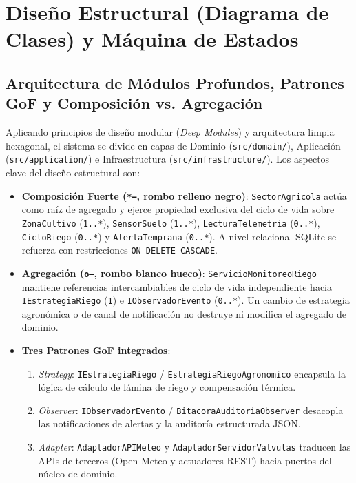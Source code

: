 \documentclass[11pt,letterpaper]{report}
\begin{document}
\chapter{Diseño Estructural (Diagrama de Clases) y Máquina de Estados}

\section{Arquitectura de Módulos Profundos, Patrones GoF y Composición vs. Agregación}
Aplicando principios de diseño modular (\textit{Deep Modules}) y arquitectura limpia hexagonal, el sistema se divide en capas de Dominio (\texttt{src/domain/}), Aplicación (\texttt{src/application/}) e Infraestructura (\texttt{src/\allowbreak infrastructure/}). Los aspectos clave del diseño estructural son:

\begin{itemize}[leftmargin=*]
    \item \textbf{Composición Fuerte (\texttt{*--}, rombo relleno negro)}: \texttt{SectorAgricola} actúa como raíz de agregado y ejerce propiedad exclusiva del ciclo de vida sobre \texttt{ZonaCultivo} (\texttt{1..*}), \texttt{SensorSuelo} (\texttt{1..*}), \texttt{LecturaTelemetria} (\texttt{0..*}), \texttt{CicloRiego} (\texttt{0..*}) y \texttt{AlertaTemprana} (\texttt{0..*}). A nivel relacional SQLite se refuerza con restricciones \texttt{ON DELETE CASCADE}.
    \item \textbf{Agregación (\texttt{o--}, rombo blanco hueco)}: \texttt{ServicioMonitoreoRiego} mantiene referencias intercambiables de ciclo de vida independiente hacia \texttt{IEstrategiaRiego} (\texttt{1}) e \texttt{IObservadorEvento} (\texttt{0..*}). Un cambio de estrategia agronómica o de canal de notificación no destruye ni modifica el agregado de dominio.
    \item \textbf{Tres Patrones GoF integrados}:
    \begin{enumerate}
        \item \textit{Strategy}: \texttt{IEstrategiaRiego} / \texttt{EstrategiaRiegoAgronomico} encapsula la lógica de cálculo de lámina de riego y compensación térmica.
        \item \textit{Observer}: \texttt{IObservadorEvento} / \texttt{BitacoraAuditoriaObserver} desacopla las notificaciones de alertas y la auditoría estructurada JSON.
        \item \textit{Adapter}: \texttt{AdaptadorAPIMeteo} y \texttt{AdaptadorServidorValvulas} traducen las APIs de terceros (Open-Meteo y actuadores REST) hacia puertos del núcleo de dominio.
    \end{enumerate}
\end{itemize}
\end{document}
